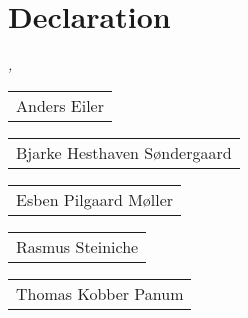 \chapter*{Declaration}
\thispagestyle{empty}
\bigskip

\noindent\textit{\myLocation, \myTime}

\bigskip

\begin{flushright}
    \begin{tabular}{m{5cm}}
        \\ \hline
        \centering Anders Eiler \\
    \end{tabular}
\end{flushright}


\bigskip

\begin{flushright}
    \begin{tabular}{m{5cm}}
        \\ \hline
        \centering Bjarke Hesthaven S\o ndergaard
    \end{tabular}
\end{flushright}


\bigskip

\begin{flushright}
    \begin{tabular}{m{5cm}}
        \\ \hline
        \centering Esben Pilgaard M\o ller
    \end{tabular}
\end{flushright}


\bigskip

\begin{flushright}
    \begin{tabular}{m{5cm}}
        \\ \hline
        \centering Rasmus Steiniche
    \end{tabular}
\end{flushright}


\bigskip

\begin{flushright}
    \begin{tabular}{m{5cm}}
        \\ \hline
        \centering Thomas Kobber Panum
    \end{tabular}
\end{flushright}

